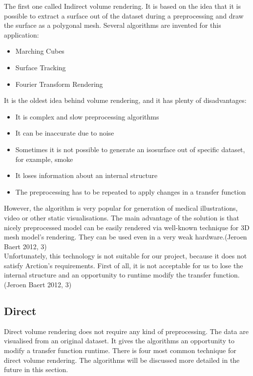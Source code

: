 \documentclass[twoside, english, 11pt]{report}
\begin{document}
The first one called Indirect volume rendering. It is based on the idea that it is possible to extract a surface out of the dataset during a preprocessing and draw the surface as a polygonal mesh. Several algorithms are invented for this application:
\begin{itemize}
\item Marching Cubes
\item Surface Tracking
\item Fourier Transform Rendering
\end{itemize}
It is the oldest idea behind volume rendering, and it has plenty of disadvantages:
\begin{itemize}
\item It is complex and slow preprocessing algorithms
\item It can be inaccurate due to noise
\item Sometimes it is not possible to generate an isosurface out of specific dataset, for example, smoke
\item It loses information about an internal structure
\item The preprocessing has to be repeated to apply changes in a transfer function 
\end{itemize}

However, the algorithm is very popular for generation of medical illustrations, video or other static visualisations. The main advantage of the solution is that nicely preprocessed model can be easily rendered via well-known technique for 3D mesh model's rendering. They can be used even in a very weak hardware.(Jeroen Baert 2012, 3)\\

Unfortunately, this technology is not suitable for our project, because it does not satisfy Arction's requirements. First of all, it is not acceptable for us to lose the internal structure and an opportunity to runtime modify the transfer function.(Jeroen Baert 2012, 3)

\subsection{Direct}
Direct volume rendering does not require any kind of preprocessing. The data are visualised from an original dataset. It gives the algorithms an opportunity to modify a transfer function runtime. There is four most common technique for direct volume rendering. The algorithms will be discussed more detailed in the future in this section.\\
\end{document}
